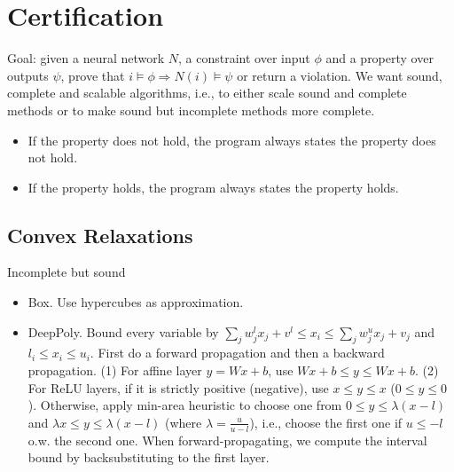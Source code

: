 \section{Certification}
Goal: given a neural network $N$, a constraint over input $\phi$ and a property over outputs $\psi$, prove that $i \vDash \phi \Rightarrow N(i) \vDash \psi$ or return a violation. We want sound, complete and scalable algorithms, i.e., to either scale sound and complete methods or to make sound but incomplete methods more complete.
\begin{itemize}
    \item If the property does not hold, the program always states the property does not hold.
    \item If the property holds, the program always states the property holds.
\end{itemize}

\subsection*{Convex Relaxations}
Incomplete but sound
\begin{itemize}
    \item Box. Use hypercubes as approximation.
    \item DeepPoly. Bound every variable by $\sum_j w^l_jx_j + v^l \leq x_i \leq \sum_j w^u_j x_j +v_j$ and $l_i \le x_i \le u_i$. First do a forward propagation and then a backward propagation. (1) For affine layer $y=Wx+b$, use $Wx+b\le y\le Wx+b$. (2) For ReLU layers, if it is strictly positive (negative), use $x\le y\le x$ ($0\le y\le 0$). Otherwise, apply min-area heuristic to choose one from $0\le y\le \lambda(x-l)$ and $\lambda x\le y \le \lambda(x-l)$ (where $\lambda=\frac{u}{u-l}$), i.e., choose the first one if $u\leq -l$ o.w. the second one. When forward-propagating, we compute the interval bound by backsubstituting to the first layer.
\end{itemize}

